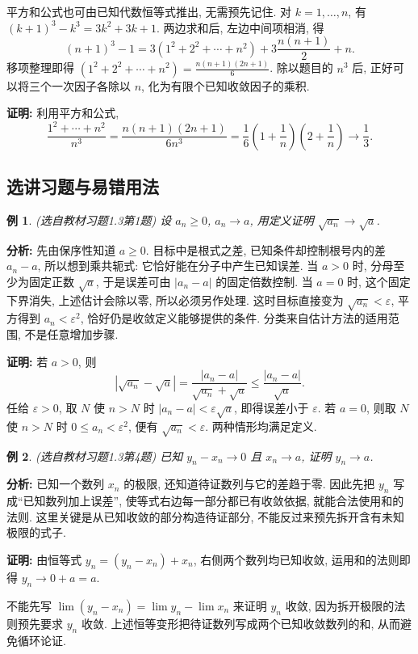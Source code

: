 \documentclass[UTF8,openany]{ctexbook}
\theoremstyle{chinesetextbook}
\newtheorem{example}{例}[section]
\newenvironment{cnproof}{\par\indent\textbf{证明:} \ignorespaces}{\par}
\begin{document}
平方和公式也可由已知代数恒等式推出, 无需预先记住. 对 $k=1,\ldots,n$, 有 $(k+1)^3-k^3=3k^2+3k+1$. 两边求和后, 左边中间项相消, 得
\[
(n+1)^3-1=3(1^2+2^2+\cdots+n^2)+3\frac{n(n+1)}2+n.
\]
移项整理即得 $\displaystyle(1^2+2^2+\cdots+n^2)=\frac{n(n+1)(2n+1)}6$. 除以题目的 $n^3$ 后, 正好可以将三个一次因子各除以 $n$, 化为有限个已知收敛因子的乘积.

\begin{cnproof}
利用平方和公式,
\[
\frac{1^2+\cdots+n^2}{n^3}
=\frac{n(n+1)(2n+1)}{6n^3}
=\frac16\left(1+\frac1n\right)\left(2+\frac1n\right)\longrightarrow\frac13.
\]
\end{cnproof}
\subsection{选讲习题与易错用法}
\begin{example}
(选自教材习题1.3第1题) 设 $a_n\ge0$, $a_n\to a$, 用定义证明 $\sqrt{a_n}\to\sqrt a$.
\end{example}
\par\indent\textbf{分析:} 先由保序性知道 $a\ge0$. 目标中是根式之差, 已知条件却控制根号内的差 $a_n-a$, 所以想到乘共轭式: 它恰好能在分子中产生已知误差. 当 $a>0$ 时, 分母至少为固定正数 $\sqrt a$, 于是误差可由 $|a_n-a|$ 的固定倍数控制. 当 $a=0$ 时, 这个固定下界消失, 上述估计会除以零, 所以必须另作处理. 这时目标直接变为 $\sqrt{a_n}<\varepsilon$, 平方得到 $a_n<\varepsilon^2$, 恰好仍是收敛定义能够提供的条件. 分类来自估计方法的适用范围, 不是任意增加步骤.
\begin{cnproof}
若 $a>0$, 则
\[
|\sqrt{a_n}-\sqrt a|
=\frac{|a_n-a|}{\sqrt{a_n}+\sqrt a}
\le\frac{|a_n-a|}{\sqrt a}.
\]
任给 $\varepsilon>0$, 取 $N$ 使 $n>N$ 时 $|a_n-a|<\varepsilon\sqrt a$, 即得误差小于 $\varepsilon$. 若 $a=0$, 则取 $N$ 使 $n>N$ 时 $0\le a_n<\varepsilon^2$, 便有 $\sqrt{a_n}<\varepsilon$. 两种情形均满足定义.
\end{cnproof}
\begin{example}
(选自教材习题1.3第4题) 已知 $y_n-x_n\to0$ 且 $x_n\to a$, 证明 $y_n\to a$.
\end{example}
\par\indent\textbf{分析:} 已知一个数列 $x_n$ 的极限, 还知道待证数列与它的差趋于零. 因此先把 $y_n$ 写成“已知数列加上误差”, 使等式右边每一部分都已有收敛依据, 就能合法使用和的法则. 这里关键是从已知收敛的部分构造待证部分, 不能反过来预先拆开含有未知极限的式子.

\begin{cnproof}
由恒等式 $y_n=(y_n-x_n)+x_n$, 右侧两个数列均已知收敛, 运用和的法则即得 $y_n\to0+a=a$.
\end{cnproof}
不能先写 $\displaystyle \lim(y_n-x_n)=\lim y_n-\lim x_n$ 来证明 $y_n$ 收敛, 因为拆开极限的法则预先要求 $y_n$ 收敛. 上述恒等变形把待证数列写成两个已知收敛数列的和, 从而避免循环论证.
\end{document}
